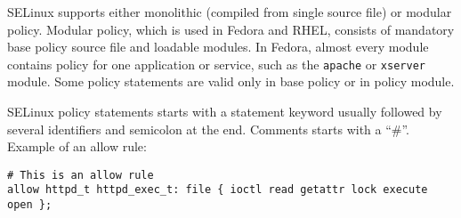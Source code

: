 SELinux supports either monolithic (compiled from single source file) or modular
policy. Modular policy, which is used in Fedora and RHEL, consists of mandatory
base policy source file and loadable modules. In Fedora, almost every module
contains policy for one application or service, such as the \texttt{apache} or
\texttt{xserver} module. Some policy statements are valid only in base policy or
in policy module.

SELinux policy statements starts with a statement keyword usually followed by
several identifiers and semicolon at the end. Comments starts with a ``\#''.
Example of an allow rule:

\begin{lstlisting}[language=te]
# This is an allow rule
allow httpd_t httpd_exec_t: file { ioctl read getattr lock execute open };
\end{lstlisting}



